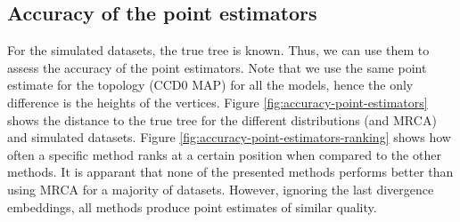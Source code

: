 \documentclass[10pt,letterpaper]{article}
\begin{document}
\subsection*{Accuracy of the point estimators}

For the simulated datasets, the true tree is known. Thus, we can use them to assess the accuracy of the point estimators. Note that we use the same point estimate for the topology (CCD0 MAP) for all the models, hence the only difference is the heights of the vertices. Figure \ref{fig:accuracy-point-estimators} shows the distance to the true tree for the different distributions (and MRCA) and simulated datasets. Figure \ref{fig:accuracy-point-estimators-ranking} shows how often a specific method ranks at a certain position when compared to the other methods. It is apparant that none of the presented methods performs better than using MRCA for a majority of datasets. However, ignoring the last divergence embeddings, all methods produce point estimates of similar quality.
\end{document}
